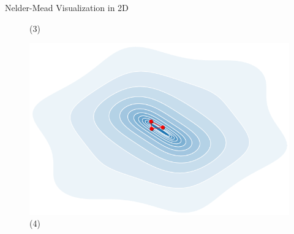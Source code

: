 \documentclass[11pt,compress,t,notes=noshow, xcolor=table]{beamer}
\begin{document}
\begin{vbframe}{Nelder-Mead Visualization in 2D}
\begin{figure}
\begin{minipage}{0.45\textwidth}
        \caption*{(3)}
    \end{minipage}\hfill
    \begin{minipage}{0.45\textwidth}
        \centering
        \includegraphics[width = 0.6\linewidth]{figure_man/nm_animation2d_4.PNG}
        \caption*{(4)}
    \end{minipage}
\end{figure}

\end{vbframe}
\end{document}
